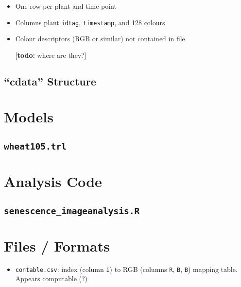 \documentclass[a4paper,fleqn]{article}
\newcommand{\todo}[1]{
  \rule{0pt}{0pt}\marginpar{{\color{blue}\rule{1ex}{1ex}}}
  {[\textbf{\color{blue}todo:} #1]}}
\begin{document}
\begin{itemize}
\item One row per plant and time point
\item Columns plant \texttt{idtag}, \texttt{timestamp}, and 128
  colours
\item Colour descriptors (RGB or similar) not contained in file
  \todo{where are they?}
\end{itemize}


\subsection{``cdata'' Structure}



\section{Models}

\subsection{\texttt{wheat105.trl}}

\begin{footnotesize}
\end{footnotesize}


\section{Analysis Code}

\subsection{\texttt{senescence\_imageanalysis.R}}

\begin{footnotesize}
\end{footnotesize}


\section{Files / Formats}

\begin{itemize}
\item \texttt{contable.csv}: index (column \texttt{i}) to RGB (columns
  \texttt{R}, \texttt{B}, \texttt{B}) mapping table. Appears
  computable (?)
\end{itemize}
\end{document}
